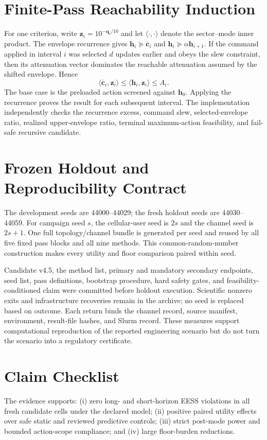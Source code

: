 \documentclass[journal]{IEEEtran}
\begin{document}
\section{Finite-Pass Reachability Induction}
For one criterion, write $\bm z_i=10^{-\bm q_i/10}$ and let $\langle\cdot,\cdot\rangle$ denote the sector--mode inner product. The envelope recurrence gives $\bm h_i\succeq\overline{\bm c}_i$ and $\bm h_i\succeq\alpha\bm h_{i+1}$. If the command applied in interval $i$ was selected $d$ updates earlier and obeys the slew constraint, then its attenuation vector dominates the reachable attenuation assumed by the shifted envelope. Hence
\begin{equation}
 \langle\overline{\bm c}_i,\bm z_i\rangle
 \le \langle\bm h_i,\bm z_i\rangle
 \le A_i.
\end{equation}
The base case is the preloaded action screened against $\bm h_0$. Applying the recurrence proves the result for each subsequent interval. The implementation independently checks the recurrence excess, command slew, selected-envelope ratio, realized upper-envelope ratio, terminal maximum-action feasibility, and fail-safe recursive candidate.

\section{Frozen Holdout and Reproducibility Contract}
The development seeds are 44000--44029; the fresh holdout seeds are 44030--44059. For campaign seed $s$, the cellular-user seed is $2s$ and the channel seed is $2s+1$. One full topology/channel bundle is generated per seed and reused by all five fixed pass blocks and all nine methods. This common-random-number construction makes every utility and floor comparison paired within seed.

Candidate v4.5, the method list, primary and mandatory secondary endpoints, seed list, pass definitions, bootstrap procedure, hard safety gates, and feasibility-conditioned claim were committed before holdout execution. Scientific nonzero exits and infrastructure recoveries remain in the archive; no seed is replaced based on outcome. Each return binds the channel record, source manifest, environment, result-file hashes, and Slurm record. These measures support computational reproduction of the reported engineering scenario but do not turn the scenario into a regulatory certificate.

\section{Claim Checklist}
The evidence supports: (i) zero long- and short-horizon EESS violations in all fresh candidate cells under the declared model; (ii) positive paired utility effects over safe static and reviewed predictive controls; (iii) strict post-mode power and bounded action-scope compliance; and (iv) large floor-burden reductions.
\end{document}
